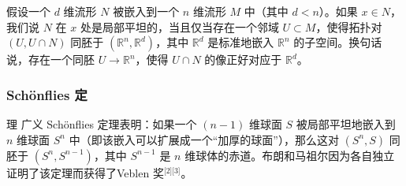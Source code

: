 假设一个 $d$ 维流形 $N$ 被嵌入到一个 $n$ 维流形 $M$ 中（其中 $d < n$）。如果 $x \in N$，我们说 $N$ 在 $x$ 处是局部平坦的，当且仅当存在一个邻域 $U \subset M$，使得拓扑对 $(U, U \cap N)$ 同胚于 $(\mathbb{R}^n, \mathbb{R}^d)$，其中 $\mathbb{R}^d$ 是标准地嵌入 $\mathbb{R}^n$ 的子空间。换句话说，存在一个同胚 $U \to \mathbb{R}^n$，使得 $U \cap N$ 的像正好对应于 $\mathbb{R}^d$。
\subsubsection{Schönflies 定}理
广义 Schönflies 定理表明：如果一个 $(n-1)$ 维球面 $S$ 被局部平坦地嵌入到 $n$ 维球面 $S^n$ 中（即该嵌入可以扩展成一个“加厚的球面”），那么这对 $(S^n, S)$ 同胚于 $(S^n, S^{n-1})$，其中 $S^{n-1}$ 是 $n$ 维球体的赤道。布朗和马祖尔因为各自独立证明了该定理而获得了Veblen 奖\(^\text{[2][3]}\)。
